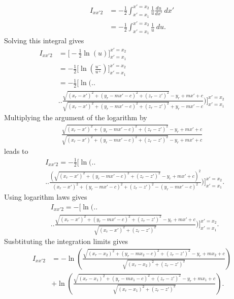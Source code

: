 \begin{align}
    I_{xx'2} &= -\frac{1}{2} \int_{x'=x_1}^{x'=x_2} \frac{1}{u} \frac{du}{dx'}\ dx' \nonumber \\
    &= -\frac{1}{2} \int_{x'=x_1}^{x'=x_2} \frac{1}{u}\ du \text{.}
\end{align}
Solving this integral gives
\begin{align}
    I_{xx'2} &= \Big[ -\frac{1}{2} \ln\left(u\right) \Big]_{x'=x_1}^{x'=x_2} \nonumber \\
    &= -\frac{1}{2} \Big[ \ln\left( \frac{u^-}{u^+} \right) \Big]_{x'=x_1}^{x'=x_2} \nonumber \\
    &= -\frac{1}{2} \Bigg[ \ln\Bigg( \Bigg. \Bigg. \nonumber \\
    & \Bigg. \Bigg. \frac{\sqrt{\left(x_r-x'\right)^2+\left(y_r-mx'-c\right)^2+\left(z_r-z'\right)^2}-y_r+mx'+c}{\sqrt{\left(x_r-x'\right)^2+\left(y_r-mx'-c\right)^2+\left(z_r-z'\right)^2}+y_r-mx'-c} \Bigg)\Bigg]_{x'=x_1}^{x'=x_2} \nonumber
\end{align}
Multiplying the argument of the logarithm by
\begin{align}
    \frac{\sqrt{\left(x_r-x'\right)^2+\left(y_r-mx'-c\right)^2+\left(z_r-z'\right)^2}-y_r+mx'+c}{\sqrt{\left(x_r-x'\right)^2+\left(y_r-mx'-c\right)^2+\left(z_r-z'\right)^2}-y_r+mx'+c}
\end{align}
leads to
\begin{align}
    &I_{xx'2} = -\frac{1}{2} \Bigg[ \ln \Bigg( \Bigg. \Bigg. \nonumber \\
    & \Bigg. \Bigg. \frac{\left(\sqrt{\left(x_r-x'\right)^2+\left(y_r-mx'-c\right)^2+\left(z_r-z'\right)^2}-y_r+mx'+c\right)^2}{\left(x_r-x'\right)^2+\left(y_r-mx'-c\right)^2+\left(z_r-z'\right)^2-\left(y_r-mx'-c\right)^2} \Bigg)\Bigg]_{x'=x_1}^{x'=x_2} \text{.}
\end{align}
Using logarithm laws gives
\begin{align}
    &I_{xx'2} = -\Bigg[ \ln \Bigg( \Bigg. \Bigg. \nonumber \\
    & \Bigg. \Bigg. \frac{\sqrt{\left(x_r-x'\right)^2+\left(y_r-mx'-c\right)^2+\left(z_r-z'\right)^2}-y_r+mx'+c}{\sqrt{\left(x_r-x'\right)^2+\left(z_r-z'\right)^2}} \Bigg)\Bigg]_{x'=x_1}^{x'=x_2} \text{.}
\end{align}
Susbtituting the integration limits gives
\begin{align}
    I_{xx'2} &= -\ln\left(\frac{\sqrt{\left(x_r-x_2\right)^2+\left(y_r-mx_2-c\right)^2+\left(z_r-z'\right)^2}-y_r+mx_2+c}{\sqrt{\left(x_r-x_2\right)^2+\left(z_r-z'\right)^2}}\right) \nonumber \\
    & + \ln\left(\frac{\sqrt{\left(x_r-x_1\right)^2+\left(y_r-mx_1-c\right)^2+\left(z_r-z'\right)^2}-y_r+mx_1+c}{\sqrt{\left(x_r-x_1\right)^2+\left(z_r-z'\right)^2}}\right) \text{.}
\end{align}
